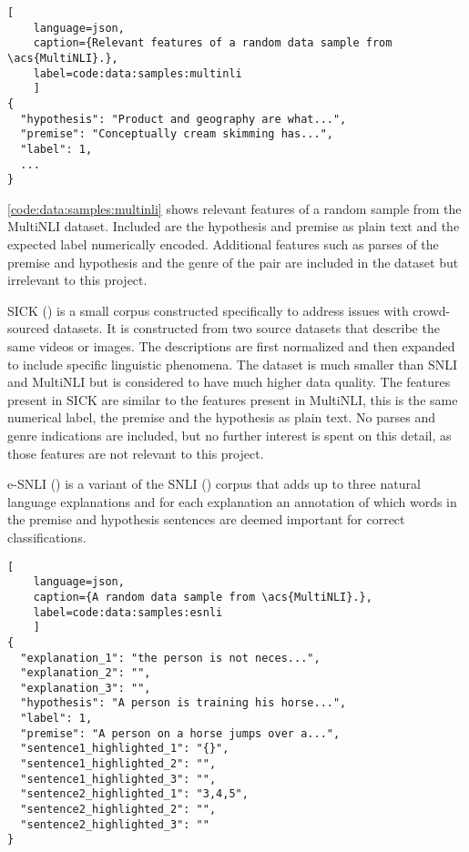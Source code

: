 \documentclass[12pt,a4paper]{article}
\begin{document}
\begin{lstlisting}[
    language=json,
    caption={Relevant features of a random data sample from \acs{MultiNLI}.},
    label=code:data:samples:multinli
    ]
{
  "hypothesis": "Product and geography are what...",
  "premise": "Conceptually cream skimming has...",
  "label": 1,
  ...
}
\end{lstlisting}

\autoref{code:data:samples:multinli} shows relevant features of a random sample from the \ac{MultiNLI} dataset. Included are the hypothesis and premise as plain text and the expected label numerically encoded. Additional features such as parses of the premise and hypothesis and the genre of the pair are included in the dataset but irrelevant to this project.

\Acf{SICK} (\cite{sick}) is a small corpus constructed specifically to address issues with crowd-sourced datasets. It is constructed from two source datasets that describe the same videos or images. The descriptions are first normalized and then expanded to include specific linguistic phenomena. The dataset is much smaller than \acs{SNLI} and \acs{MultiNLI} but is considered to have much higher data quality. The features present in \acs{SICK} are similar to the features present in \acs{MultiNLI}, this is the same numerical label, the premise and the hypothesis as plain text. No parses and genre indications are included, but no further interest is spent on this detail, as those features are not relevant to this project.

\Acf{e-SNLI} (\cite{esnli}) is a variant of the \acs{SNLI} (\cite{snli}) corpus that adds up to three natural language explanations and for each explanation an annotation of which words in the premise and hypothesis sentences are deemed important for correct classifications.

\begin{lstlisting}[
    language=json,
    caption={A random data sample from \acs{MultiNLI}.},
    label=code:data:samples:esnli
    ]
{
  "explanation_1": "the person is not neces...",
  "explanation_2": "",
  "explanation_3": "",
  "hypothesis": "A person is training his horse...",
  "label": 1,
  "premise": "A person on a horse jumps over a...",
  "sentence1_highlighted_1": "{}",
  "sentence1_highlighted_2": "",
  "sentence1_highlighted_3": "",
  "sentence2_highlighted_1": "3,4,5",
  "sentence2_highlighted_2": "",
  "sentence2_highlighted_3": ""
}
\end{lstlisting}
\end{document}
